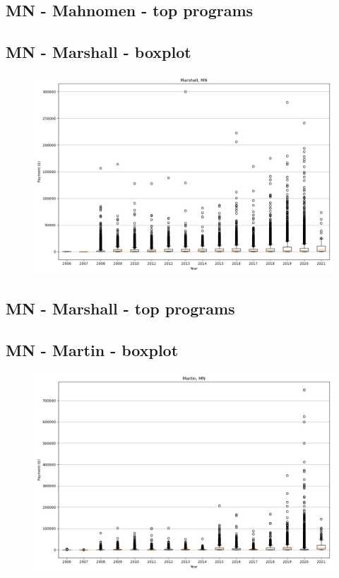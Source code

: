 \subsection*{MN - Mahnomen - top programs}

\newpage
\subsection*{MN - Marshall - boxplot}
\begin{figure}[h]
\centering
\includegraphics[width=7in]{../output/boxplots/counties/Marshall-MN_boxplot.png}
\end{figure}


\subsection*{MN - Marshall - top programs}

\newpage
\subsection*{MN - Martin - boxplot}
\begin{figure}[h]
\centering
\includegraphics[width=7in]{../output/boxplots/counties/Martin-MN_boxplot.png}
\end{figure}


